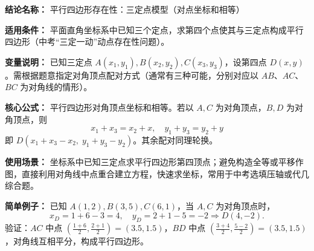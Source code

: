 \textbf{结论名称：} 平行四边形存在性：三定点模型（对点坐标和相等）

\textbf{适用条件：} 平面直角坐标系中已知三个定点，求第四个点使其与三定点构成平行四边形（中考“三定一动”动点存在性问题）。

\textbf{变量说明：} 已知三定点 \(A(x_1,y_1), B(x_2,y_2), C(x_3,y_3)\)，设第四点 \(D(x,y)\)。需根据题意指定对角顶点配对方式（通常有三种可能，分别对应以 \(AB\)、\(AC\)、\(BC\) 为对角线的情形）。

\textbf{核心公式：} 平行四边形对角顶点坐标和相等。若以 \(A,C\) 为对角顶点，\(B,D\) 为对角顶点，则
\[
\boxed{x_1 + x_3 = x_2 + x,\quad y_1 + y_3 = y_2 + y}
\]
即 \(D(x_1+x_3-x_2,\; y_1+y_3-y_2)\)。其余配对同理轮换。

\textbf{使用场景：} 坐标系中已知三定点求平行四边形第四顶点；避免构造全等或平移作图，直接利用对角线中点重合建立方程，快速求坐标，常用于中考选填压轴或代几综合题。

\textbf{简单例子：} 已知 \(A(1,2), B(3,5), C(6,1)\)，当 \(A,C\) 为对角顶点时，
\[
x_D = 1+6-3=4,\quad y_D = 2+1-5=-2 \Rightarrow D(4,-2).
\]
验证：\(AC\) 中点 \((\frac{1+6}{2},\frac{2+1}{2})=(3.5,1.5)\)，\(BD\) 中点 \((\frac{3+4}{2},\frac{5-2}{2})=(3.5,1.5)\)，对角线互相平分，构成平行四边形。